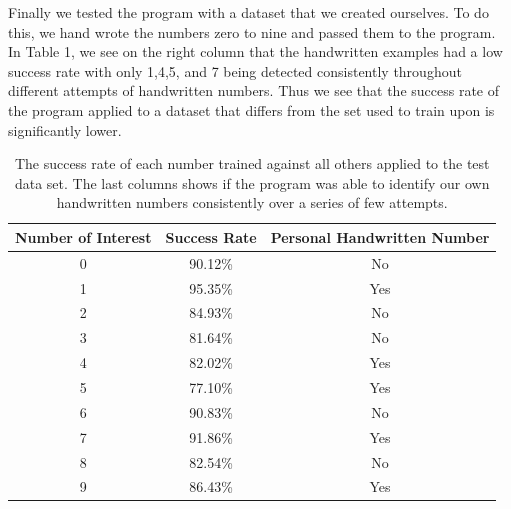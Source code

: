 \documentclass[12pt]{article}%
\numberwithin{equation}{subsection}
\begin{document}
Finally we tested the program with a dataset that we created ourselves. To do this, we hand wrote the numbers zero to nine and passed them to the program. In Table 1, we see on the right column that the handwritten examples had a low success rate with only 1,4,5, and 7 being detected consistently throughout different attempts of handwritten numbers. Thus we see that the success rate of the program applied to a dataset that differs from the set used to train upon is significantly lower.

\begin{table}
    \centering
    \begin{tabular}{ccc}
          Number of Interest &   Success Rate &   Personal Handwritten Number\\
        \hline\hline
         0 &  90.12\% &  No\\
       
         1 &  95.35\% &   Yes\\
       
         2 &  84.93\% &   No\\
       
         3 &  81.64\% &   No\\
       
         4 &  82.02\% &   Yes\\
       
         5 &  77.10\% &   Yes\\
       
         6 &  90.83\% &  No\\
       
         7 &  91.86\% &  Yes\\
       
         8 &  82.54\% &  No\\
       
         9 &  86.43\% &  Yes\\
    \end{tabular}
    \caption{The success rate of each number trained against all others applied to the test data set. The last columns shows if the program was able to identify our own handwritten numbers consistently over a series of few attempts.}
    \label{Table}
\end{table}
\normalsize
\end{document}
